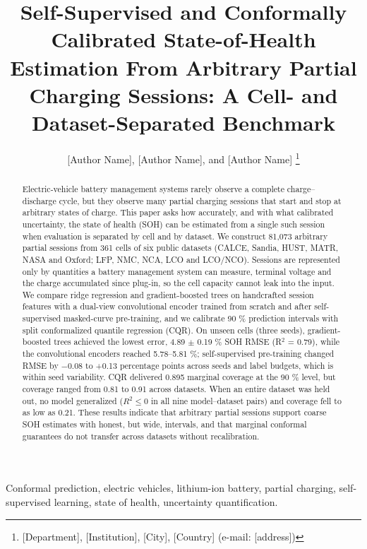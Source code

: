 \documentclass[journal]{IEEEtran}
\begin{document}
\title{Self-Supervised and Conformally Calibrated State-of-Health Estimation From Arbitrary Partial Charging Sessions: A Cell- and Dataset-Separated Benchmark}
\author{{[}Author Name{]}, {[}Author Name{]}, and {[}Author Name{]}%
\thanks{{[}Department{]}, {[}Institution{]}, {[}City{]}, {[}Country{]} (e-mail: {[}address{]})}}
\maketitle
\begin{abstract}
Electric-vehicle battery management systems rarely observe a complete charge--discharge cycle, but they observe many partial charging sessions that start and stop at arbitrary states of charge. This paper asks how accurately, and with what calibrated uncertainty, the state of health (SOH) can be estimated from a single such session when evaluation is separated by cell and by dataset. We construct 81,073 arbitrary partial sessions from 361 cells of six public datasets (CALCE, Sandia, HUST, MATR, NASA and Oxford; LFP, NMC, NCA, LCO and LCO/NCO). Sessions are represented only by quantities a battery management system can measure, terminal voltage and the charge accumulated since plug-in, so the cell capacity cannot leak into the input. We compare ridge regression and gradient-boosted trees on handcrafted session features with a dual-view convolutional encoder trained from scratch and after self-supervised masked-curve pre-training, and we calibrate 90 \% prediction intervals with split conformalized quantile regression (CQR). On unseen cells (three seeds), gradient-boosted trees achieved the lowest error, 4.89 $\pm$ 0.19 \% SOH RMSE (R$^2$ = 0.79), while the convolutional encoders reached 5.78--5.81 \%; self-supervised pre-training changed RMSE by $-$0.08 to +0.13 percentage points across seeds and label budgets, which is within seed variability. CQR delivered 0.895 marginal coverage at the 90 \% level, but coverage ranged from 0.81 to 0.91 across datasets. When an entire dataset was held out, no model generalized (\(R^2\le0\) in all nine model--dataset pairs) and coverage fell to as low as 0.21. These results indicate that arbitrary partial sessions support coarse SOH estimates with honest, but wide, intervals, and that marginal conformal guarantees do not transfer across datasets without recalibration.
\end{abstract}
\begin{IEEEkeywords}
Conformal prediction, electric vehicles, lithium-ion battery, partial charging, self-supervised learning, state of health, uncertainty quantification.
\end{IEEEkeywords}
\end{document}

